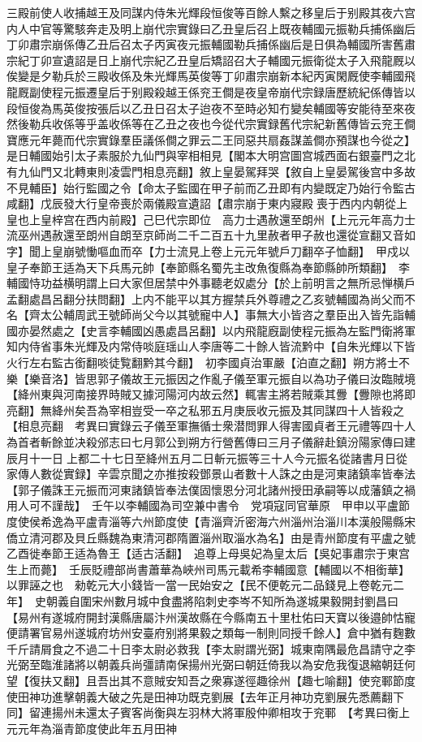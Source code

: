 三殿前使人收捕越王及同謀内侍朱光輝段恒俊等百餘人繫之移皇后于别殿其夜六宫内人中官等驚駭奔走及明上崩代宗實錄曰乙丑皇后召上既夜輔國元振勒兵捕係幽后丁卯肅宗崩係傳乙丑后召太子丙寅夜元振輔國勒兵捕係幽后是日俱為輔國所害舊肅宗紀丁卯宣遺詔是日上崩代宗紀乙丑皇后矯詔召大子輔國元振衛從太子入飛龍厩以俟變是夕勒兵於三殿收係及朱光輝馬英俊等丁卯肅宗崩新本紀丙寅閑厩使李輔國飛龍厩副使程元振遷皇后于别殿殺越王係兖王僴是夜皇帝崩代宗録唐歷統紀係傳皆以段恒俊為馬英俊按張后以乙丑日召太子迨夜不至時必知冇變矣輔國等安能待至來夜然後勒兵收係等乎盖收係等在乙丑之夜也今從代宗實録舊代宗紀新舊傳皆云兖王僴寶應元年薨而代宗實錄羣臣議係僴之罪云二王同惡共扇姦謀盖僴亦預謀也今從之】是日輔國始引太子素服於九仙門與宰相相見【閣本大明宫圖宫城西面右銀臺門之北有九仙門又北轉東則凌雲門相息亮翻】敘上皇晏駕拜哭【敘自上皇晏駕後宫中多故不見輔臣】始行監國之令【命太子監國在甲子前而乙丑即有内變既定乃始行令監古咸翻】戊辰發大行皇帝喪於兩儀殿宣遺詔【肅宗崩于東内寢殿喪于西内内朝從上皇也上皇梓宫在西内前殿】己巳代宗即位　高力士遇赦還至朗州【上元元年高力士流巫州遇赦還至朗州自朗至京師尚二千二百五十九里赦者甲子赦也還從宣翻又音如字】聞上皇崩號慟嘔血而卒【力士流見上卷上元元年號戶刀翻卒子恤翻】　甲戍以皇子奉節王适為天下兵馬元帥【奉節縣名蜀先主改魚復縣為奉節縣帥所類翻】　李輔國恃功益横明謂上曰大家但居禁中外事聽老奴處分【於上前明言之無所忌惮横戶孟翻處昌呂翻分扶問翻】上内不能平以其方握禁兵外尊禮之乙亥號輔國為尚父而不名【齊太公輔周武王號師尚父今以其號寵中人】事無大小皆咨之羣臣出入皆先詣輔國亦晏然處之【史言李輔國凶愚處昌呂翻】以内飛龍廐副使程元振為左監門衛將軍知内侍省事朱光輝及内常侍啖庭瑶山人李唐等二十餘人皆流黔中【自朱光輝以下皆火行左右監古銜翻啖徒覧翻黔其今翻】　初李國貞治軍嚴【泊直之翻】朔方將士不樂【樂音洛】皆思郭子儀故王元振因之作亂子儀至軍元振自以為功子儀曰汝臨賊境【絳州東與河南接界時賊又據河陽河内故云然】輒害主將若賊乘其釁【釁隙也將即亮翻】無絳州矣吾為宰相豈受一卒之私邪五月庚辰收元振及其同謀四十人皆殺之【相息亮翻　考異曰實錄云子儀至軍撫循士衆潜問罪人得害國貞者王元禮等四十人為首者斬餘並决殺邠志曰七月郭公到朔方行營舊傳曰三月子儀辭赴鎮汾陽家傳曰建辰月十一日上都二十七日至絳州五月二日斬元振等三十人今元振名從諸書月日從家傳人數從實録】辛雲京聞之亦推按殺鄧景山者數十人誅之由是河東諸鎮率皆奉法【郭子儀誅王元振而河東諸鎮皆奉法僕固懷恩分河北諸州授田承嗣等以成藩鎮之禍用人可不謹哉】　壬午以李輔國為司空兼中書令　党項寇同官華原　甲申以平盧節度使侯希逸為平盧青淄等六州節度使【青淄齊沂密海六州淄州治淄川本漢般陽縣宋僑立清河郡及貝丘縣魏為東清河郡隋置淄州取淄水為名】由是青州節度有平盧之號　乙酉徙奉節王适為魯王【适古活翻】　追尊上母吳妃為皇太后【吳妃事肅宗于東宫生上而薨】　壬辰貶禮部尚書蕭華為峽州司馬元載希李輔國意【輔國以不相銜華】以罪誣之也　勑乾元大小錢皆一當一民始安之【民不便乾元二品錢見上卷乾元二年】　史朝義自圍宋州數月城中食盡將陷刺史李岑不知所為遂城果毅開封劉昌曰【易州有遂城府開封漢縣唐屬汴州漢故縣在今縣南五十里杜佑曰天寶以後邉帥怙寵便請署官易州遂城府坊州安臺府别將果毅之類每一制則同授千餘人】倉中猶有麴數千斤請屑食之不過二十日李太尉必救我【李太尉謂光弼】城東南隅最危昌請守之李光弼至臨淮諸將以朝義兵尚彊請南保揚州光弼曰朝廷倚我以為安危我復退縮朝廷何望【復扶又翻】且吾出其不意賊安知吾之衆寡遂徑趣徐州【趣七喻翻】使兖鄆節度使田神功進擊朝義大破之先是田神功既克劉展【去年正月神功克劉展先悉薦翻下同】留連揚州未還太子賓客尚衡與左羽林大將軍殷仲卿相攻于兖鄆　【考異曰衡上元元年為淄青節度使此年五月田神